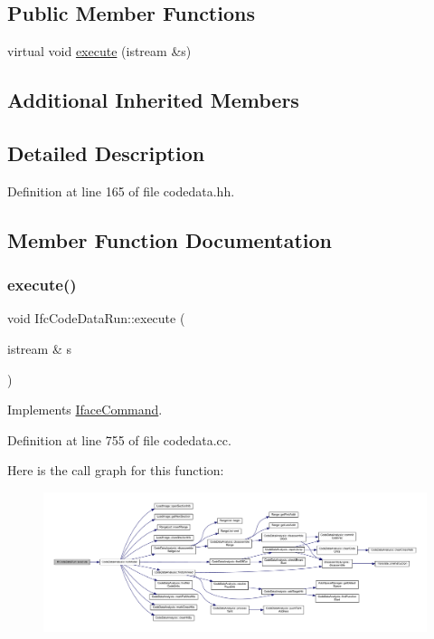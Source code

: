 \subsection*{Public Member Functions}
\begin{DoxyCompactItemize}
\item 
virtual void \mbox{\hyperlink{class_ifc_code_data_run_a404246226c137a94b454bd5955f4d560}{execute}} (istream \&s)
\end{DoxyCompactItemize}
\subsection*{Additional Inherited Members}


\subsection{Detailed Description}


Definition at line 165 of file codedata.\+hh.



\subsection{Member Function Documentation}
\mbox{\label{class_ifc_code_data_run_a404246226c137a94b454bd5955f4d560}} 
\subsubsection{\texorpdfstring{execute()}{execute()}}
{\footnotesize\ttfamily void Ifc\+Code\+Data\+Run\+::execute (\begin{DoxyParamCaption}\item[{istream \&}]{s }\end{DoxyParamCaption})\hspace{0.3cm}{\ttfamily [virtual]}}



Implements \mbox{\hyperlink{class_iface_command_af10e29cee2c8e419de6efe9e680ad201}{Iface\+Command}}.



Definition at line 755 of file codedata.\+cc.

Here is the call graph for this function\+:
\nopagebreak
\begin{figure}[H]
\begin{center}
\leavevmode
\includegraphics[width=350pt]{class_ifc_code_data_run_a404246226c137a94b454bd5955f4d560_cgraph}
\end{center}
\end{figure}


